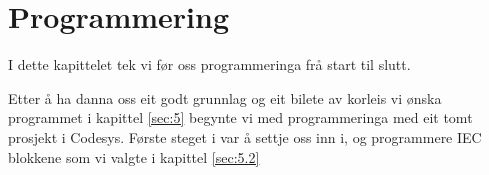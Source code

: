\chapter{Programmering}
\thispagestyle{fancy}
I dette kapittelet tek vi før oss programmeringa frå start til slutt.

Etter å ha danna oss eit godt grunnlag og eit bilete av korleis vi ønska programmet i kapittel \ref{sec:5} 
begynte vi med programmeringa med eit tomt prosjekt i \gls{Codesys}. Første steget i var å 
settje oss inn i, og programmere IEC blokkene som vi valgte i kapittel \ref{sec:5.2} 



